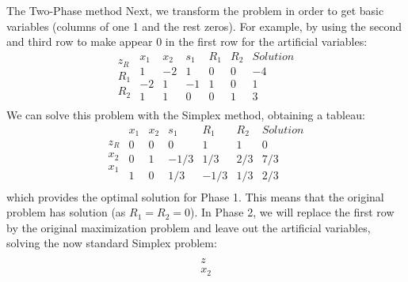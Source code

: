 \documentclass[c]{beamer}
\begin{document}
\begin{frame}[allowframebreaks]{The Two-Phase method}
  Next, we transform the problem in order to get  basic variables (columns of one 1 and the rest zeros). For example, by using the second and third row to make appear 0 in the first row for the artificial variables:
  \begin{equation*}
    \begin{array}{c}
    \\
    z_R\\
    R_1\\
    R_2\\
    \end{array}
    \begin{array}{ccccc|c}
       x_1 & x_2 & s_1 & R_1 & R_2 & Solution \\ \hline
       1 & -2 & 1 & 0 & 0 & -4 \\ \hline
       -2 & 1 & -1 & 1 & 0 & 1  \\
       1 & 1 & 0 & 0 & 1 & 3 \\
    \end{array}
  \end{equation*}
  We can solve this problem with the Simplex method, obtaining a tableau:
  \begin{equation*}
    \begin{array}{c}
    \\
    z_R\\
    x_2\\
    x_1\\
    \end{array}
    \begin{array}{ccccc|c}
       x_1 & x_2 & s_1 & R_1 & R_2 & Solution \\ \hline
       0 & 0 & 0 & 1 & 1 & 0 \\ \hline
       0 & 1 & -1/3 & 1/3 & 2/3 & 7/3  \\
       1 & 0 & 1/3 & -1/3 & 1/3 & 2/3 \\
    \end{array}
  \end{equation*}
    which provides the optimal solution for Phase 1. This means that the original problem has solution (as $R_1=R_2=0$). In Phase 2, we will replace the first row by the original maximization problem and leave out the artificial variables, solving the now standard Simplex problem:
    \begin{equation*}
      \begin{array}{c}
        \\
        z\\
        x_2\\

\end{array}
\end{equation*}
\end{frame}
\end{document}
